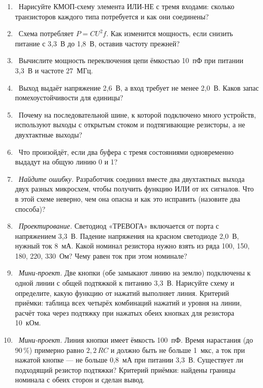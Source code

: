\begin{taskbox}
\begin{enumerate}
  \item {}~Нарисуйте КМОП-схему элемента ИЛИ-НЕ с тремя входами: сколько
        транзисторов каждого типа потребуется и как они соединены?
  \item {}~Схема потребляет $P = C U^2 f$. Как изменится мощность, если
        снизить питание с 3,3~В до 1,8~В, оставив частоту прежней?
  \item {}~Вычислите мощность переключения цепи ёмкостью 10~пФ при питании
        3,3~В и частоте 27~МГц.
  \item {}~Выход выдаёт напряжение 2,6~В, а вход требует не менее 2,0~В. Каков запас
        помехоустойчивости для единицы?
  \item {}~Почему на последовательной шине, к которой подключено много
        устройств, используют выходы с открытым стоком и подтягивающие
        резисторы, а не двухтактные выходы?
  \item {}~Что произойдёт, если два буфера с тремя состояниями одновременно
        выдадут на общую линию 0 и 1?
  \item {}~\emph{Найдите ошибку.} Разработчик соединил вместе два
        двухтактных выхода двух разных микросхем, чтобы получить функцию ИЛИ
        от их сигналов. Что в этой схеме неверно, чем она опасна и как это
        исправить (назовите два способа)?
  \item {}~\emph{Проектирование.} Светодиод «ТРЕВОГА» включается от порта
        с напряжением 3,3~В. Падение напряжения на красном светодиоде 2,0~В,
        нужный ток 8~мА. Какой номинал резистора нужно взять из ряда 100, 150,
        180, 220, 330~Ом? Чему равен ток при этом номинале?
  \item {}~\emph{Мини-проект.} Две кнопки (обе замыкают линию на землю)
        подключены к одной линии с общей подтяжкой к питанию 3,3~В.
        Нарисуйте схему и определите, какую функцию от нажатий выполняет
        линия. Критерий приёмки: таблица всех четырёх комбинаций нажатий и
        уровня на линии, расчёт тока через подтяжку при нажатых обеих кнопках
        для резистора 10~кОм.
  \item {}~\emph{Мини-проект.} Линия кнопки имеет ёмкость 100~пФ.
        Время нарастания (до 90\,\%) примерно равно $2{,}2\,RC$ и должно быть не
        больше 1~мкс, а ток при нажатой кнопке --- не больше 0,8~мА при питании
        3,3~В. Существует ли подходящий резистор подтяжки? Критерий приёмки:
        найдены границы номинала с обеих сторон и сделан вывод.
\end{enumerate}
\end{taskbox}

